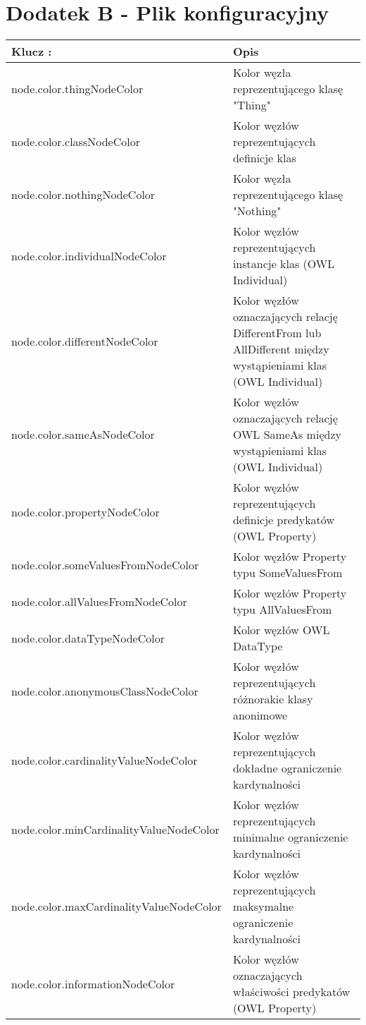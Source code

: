 
\chapter*{Dodatek B - Plik konfiguracyjny}

\begin{longtable}{|l|m{7cm}|} \hline
Klucz : & Opis  \\ \hline



node.color.thingNodeColor & Kolor węzła reprezentującego klasę "Thing" \\ \hline

node.color.classNodeColor & Kolor węzłów reprezentujących definicje klas  \\ \hline
node.color.nothingNodeColor & Kolor węzła reprezentującego klasę "Nothing"  \\ \hline
node.color.individualNodeColor & Kolor węzłów reprezentujących instancje klas (OWL Individual)   \\ \hline
node.color.differentNodeColor & Kolor węzłów oznaczających relację DifferentFrom lub AllDifferent między wystąpieniami klas (OWL Individual)   \\ \hline
node.color.sameAsNodeColor & Kolor węzłów oznaczających relację OWL SameAs między wystąpieniami klas (OWL Individual)   \\ \hline
node.color.propertyNodeColor & Kolor węzłów reprezentujących definicje predykatów (OWL Property)  \\ \hline
node.color.someValuesFromNodeColor & Kolor węzłów Property typu SomeValuesFrom  \\ \hline
node.color.allValuesFromNodeColor & Kolor węzłów Property typu AllValuesFrom   \\ \hline
node.color.dataTypeNodeColor & Kolor węzłów OWL DataType   \\ \hline
node.color.anonymousClassNodeColor & Kolor węzłów reprezentujących różnorakie klasy anonimowe   \\ \hline
node.color.cardinalityValueNodeColor & Kolor węzłów reprezentujących dokładne ograniczenie kardynalności  \\ \hline
node.color.minCardinalityValueNodeColor & Kolor węzłów reprezentujących minimalne ograniczenie kardynalności   \\ \hline
node.color.maxCardinalityValueNodeColor & Kolor węzłów reprezentujących maksymalne ograniczenie kardynalności   \\ \hline
node.color.informationNodeColor & Kolor węzłów oznaczających właściwości predykatów (OWL Property)   \\ \hline

\end{longtable}
